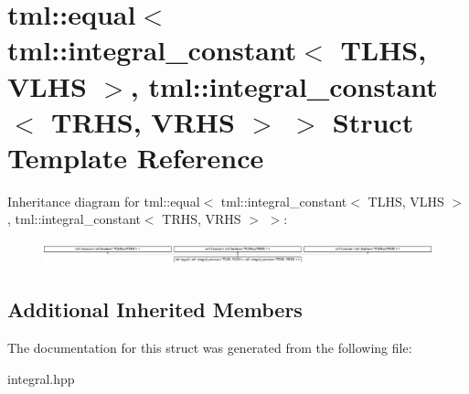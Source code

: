 \hypertarget{structtml_1_1equal_3_01tml_1_1integral__constant_3_01TLHS_00_01VLHS_01_4_00_01tml_1_1integral__c645b442518d39776ceffa06816e42113}{\section{tml\+:\+:equal$<$ tml\+:\+:integral\+\_\+constant$<$ T\+L\+H\+S, V\+L\+H\+S $>$, tml\+:\+:integral\+\_\+constant$<$ T\+R\+H\+S, V\+R\+H\+S $>$ $>$ Struct Template Reference}
\label{structtml_1_1equal_3_01tml_1_1integral__constant_3_01TLHS_00_01VLHS_01_4_00_01tml_1_1integral__c645b442518d39776ceffa06816e42113}
}
Inheritance diagram for tml\+:\+:equal$<$ tml\+:\+:integral\+\_\+constant$<$ T\+L\+H\+S, V\+L\+H\+S $>$, tml\+:\+:integral\+\_\+constant$<$ T\+R\+H\+S, V\+R\+H\+S $>$ $>$\+:\begin{figure}[H]
\begin{center}
\leavevmode
\includegraphics[height=0.699126cm]{structtml_1_1equal_3_01tml_1_1integral__constant_3_01TLHS_00_01VLHS_01_4_00_01tml_1_1integral__c645b442518d39776ceffa06816e42113}
\end{center}
\end{figure}
\subsection*{Additional Inherited Members}


The documentation for this struct was generated from the following file\+:\begin{DoxyCompactItemize}
\item 
integral.\+hpp\end{DoxyCompactItemize}
